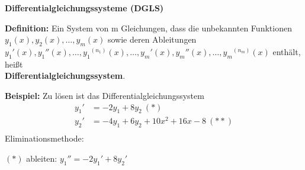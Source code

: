 \documentclass[fontset=ubuntu,12pt,a4paper,fleqn]{article}
\begin{document}
{\Large\textbf{Differentialgleichungssysteme (DGLS)}\par}
\textbf{Definition:} Ein System von m Gleichungen, dass die unbekannten Funktionen \(y_1(x),y_2(x),\dots,y_m(x)\) sowie deren Ableitungen \\
\({y_1}'(x),{y_1}''(x),\dots,{y_1}^{(n_1)}(x),\dots,{y_m}'(x),{y_m}''(x),\dots,{y_m}^{(n_m)}(x)\) enthält, heißt \\ \textbf{Differentialgleichungssystem}.
\begin{multicols}{2}
	\textbf{Beispiel:}
	Zu lösen ist das Differentialgleichungssystem
	\begin{align*}
	{y_1}' &= -2y_1+8y_2\ (*) \\
	{y_2}' &= -4y_1+6y_2+10x^2+16x-8\ (**) \\
	\end{align*}
	Eliminationsmethode:
	
	\((*)\) ableiten: \({y_1}'' = -2{y_1}'+8{y_2}'\)
	

\end{multicols}
\end{document}
